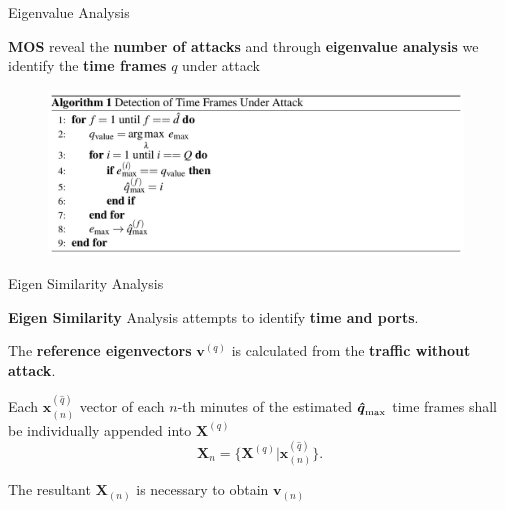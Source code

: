 \documentclass[newPxFont, numfooter, sectionpages]{beamer}
\begin{document}
\begin{frame}{Eigenvalue Analysis}
	
	\textbf{MOS} reveal the \textbf{number of attacks} and through \textbf{eigenvalue analysis} we identify the \textbf{time frames} $q$ under attack

	\begin{figure}[h!]
	     \centering 
	     \includegraphics[width=11cm]{alg.png}
	     \label{fig:2_fig91}
	\end{figure}

\end{frame}
\begin{frame}{Eigen Similarity Analysis}
	
	\textbf{Eigen Similarity} Analysis attempts to identify \textbf{time and ports}.

	The \textbf{reference eigenvectors} $\boldsymbol{v}^{(q)}$ is calculated from the \textbf{traffic without attack}.

	Each $\boldsymbol{x}^{(\hat{q})}_{(n)}$ vector of each $n$-th minutes of the estimated $\rm{\boldsymbol{\hat{q}}}_{\rm max}$ time frames shall be individually appended into $\boldsymbol{X}^{(q)}$
	\begin{equation}\label{eq:eq12}
		\boldsymbol{X}_{n} = \{\boldsymbol{X}^{(q)} | \boldsymbol{x}^{(\hat{q})}_{(n)}\}.
	\end{equation}

	The resultant $\boldsymbol{X}_{(n)}$ is necessary to obtain $\boldsymbol{v}_{(n)}$

\end{frame}
\end{document}
